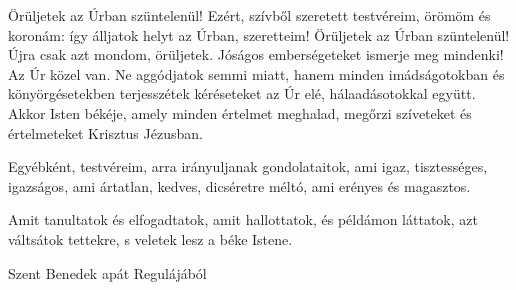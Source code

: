 \documentclass[twoside]{article}
\begin{document}
\begin{lectio}{Örüljetek az Úrban szüntelenül!}
Ezért, szívből szeretett testvéreim, örömöm és koronám: így álljatok helyt az Úrban, szeretteim! Örüljetek az Úrban szüntelenül! Újra csak azt mondom, örüljetek. Jóságos emberségeteket ismerje meg mindenki! Az Úr közel van. Ne aggódjatok semmi miatt, hanem minden imádságotokban és könyörgésetekben terjesszétek kéréseteket az Úr elé, hálaadásotokkal együtt. Akkor Isten békéje, amely minden értelmet meghalad, megőrzi szíveteket és értelmeteket Krisztus Jézusban.

Egyébként, testvéreim, arra irányuljanak gondolataitok, ami igaz, tisztességes, igazságos, ami ártatlan, kedves, dicséretre méltó, ami erényes és magasztos.

Amit tanultatok és elfogadtatok, amit hallottatok, és példámon láttatok, azt váltsátok tettekre, s veletek lesz a béke Istene.
\end{lectio}



Szent Benedek apát Regulájából

{\centering{}}
\end{document}
